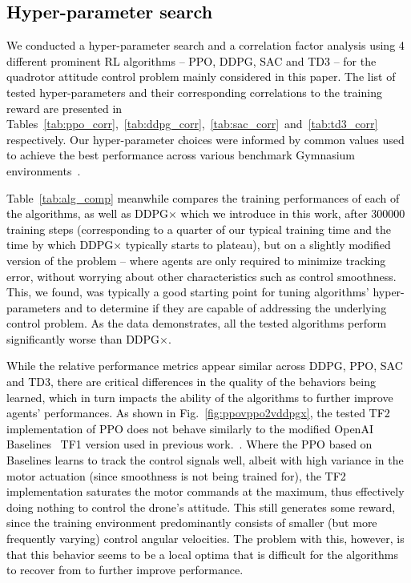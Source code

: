 \documentclass[letterpaper, 10 pt, conference]{ieeeconf} %
\newcommand{\rev}[1]{\textcolor{black}{#1}}
\begin{document}
\subsection{\rev{Hyper-parameter search}}\label{A:hypersearch}
    \rev{
    We conducted a hyper-parameter search and a correlation factor analysis using 4 different prominent RL algorithms -- PPO, DDPG, SAC and TD3 -- for the quadrotor attitude control problem mainly considered in this paper. 
    The list of tested hyper-parameters and their corresponding correlations to the training reward are presented in Tables~\ref{tab:ppo_corr},~\ref{tab:ddpg_corr},~\ref{tab:sac_corr}~and~\ref{tab:td3_corr} respectively.
    Our hyper-parameter choices were informed by common values used to achieve the best performance across various benchmark Gymnasium environments~\cite{rl-zoo}.
    }
    
    \rev{
    Table~\ref{tab:alg_comp} meanwhile compares the training performances of each of the algorithms, as well as DDPG$\times$ which we introduce in this work, after 300000 training steps (corresponding to a quarter of our typical training time and the time by which DDPG$\times$ typically starts to plateau), but on a slightly modified version of the problem -- where agents are only required to minimize tracking error, without worrying about other characteristics such as control smoothness.
    This, we found, was typically a good starting point for tuning algorithms' hyper-parameters and to determine if they are capable of addressing the underlying control problem.
    As the data demonstrates, all the tested algorithms perform significantly worse than DDPG$\times$.
    }
    
    \rev{
    While the relative performance metrics appear similar across DDPG, PPO, SAC and TD3, there are critical differences in the quality of the behaviors being learned, which in turn impacts the ability of the algorithms to further improve agents' performances.
    As shown in Fig.~\ref{fig:ppovppo2vddpgx}, the tested TF2 implementation of PPO does not behave similarly to the modified OpenAI Baselines~\cite{baselines} TF1 version used in previous work.~\cite{mysore2021caps,mysore2021train, NFv2}.
    Where the PPO based on Baselines learns to track the control signals well, albeit with high variance in the motor actuation (since smoothness is not being trained for), the TF2 implementation saturates the motor commands at the maximum, thus effectively doing nothing to control the drone's attitude.
    This still generates some reward, since the training environment predominantly consists of smaller (but more frequently varying) control angular velocities.
    The problem with this, however, is that this behavior seems to be a local optima that is difficult for the algorithms to recover from to further improve performance.
    }
    
\end{document}
